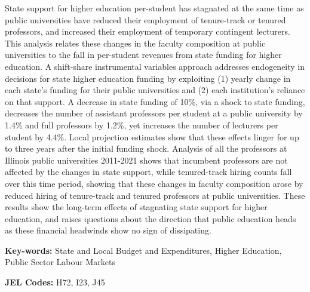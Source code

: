 \noindent
State support for higher education per-student has stagnated at the same time as public universities have reduced their employment of tenure-track or tenured professors, and increased their employment of temporary contingent lecturers.
This analysis relates these changes in the faculty composition at public universities to the fall in per-student revenues from state funding for higher education.
A shift-share instrumental variables approach addresses endogeneity in decisions for state higher education funding by exploiting (1) yearly change in each state's funding for their public universities and (2) each institution's reliance on that support.
A decrease in state funding of 10\%, via a shock to state funding, decreases the number of assistant professors per student at a public university by 1.4\% and full professors by 1.2\%, yet increases the number of lecturers per student by 4.4\%.
Local projection estimates show that these effects linger for up to three years after the initial funding shock.
Analysis of all the professors at Illinois public universities 2011-2021 shows that incumbent professors are not affected by the changes in state support, while tenured-track hiring counts fall over this time period, showing that these changes in faculty composition arose by reduced hiring of tenure-track and tenured professors at public universities.
These results show the long-term effects of stagnating state support for higher education, and raises questions about the direction that public education heads as these financial headwinds show no sign of dissipating.

\noindent
\textbf{Key-words:}
State and Local Budget and Expenditures,
Higher Education,
Public Sector Labour Markets

\noindent
\textbf{JEL Codes:} H72, I23, J45
